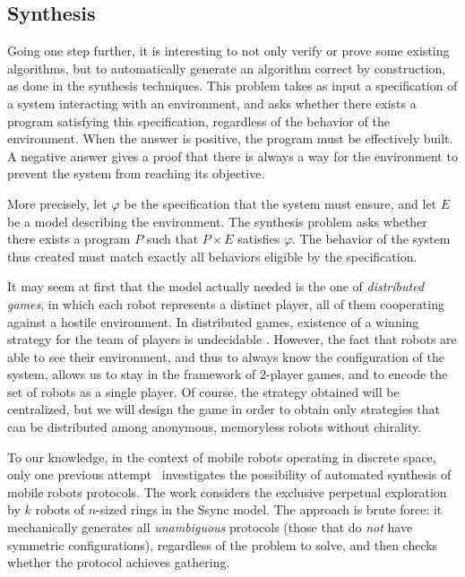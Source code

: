 		\subsection{Synthesis}	 
Going one step further, it is interesting to not only verify or prove some existing algorithms, but to automatically generate an algorithm correct by construction, as done in the synthesis techniques. 
This problem takes as input a specification of a system interacting with an environment, and asks whether there exists a program  satisfying this specification, regardless of the behavior of the environment. When the answer is positive, the program must be effectively built. 
A negative answer gives a proof that there is always a way for the environment to prevent the system from reaching its objective. 

More precisely, let $\varphi$ be the specification that the system must ensure, and let $E$ be a model describing the environment.
The synthesis problem asks whether there exists a program $P$ such that  $P \times E$ satisfies $\varphi$.
The behavior of the system thus created must match exactly all behaviors eligible by the specification. 

It may seem at first that the model actually needed is the one of \emph{distributed games}, in which each robot represents a distinct player, all of them cooperating against a hostile environment. In distributed games, existence of a winning strategy
for the team of players is undecidable \cite{PetersonReif79}. However, the fact that robots are able to see their environment, and thus to always know the configuration of the system, allows us to stay in the framework of 2-player games, and to encode the set of robots as a single player. 
Of course, the strategy obtained will be centralized, but we will design the game in order to obtain only strategies that can be distributed among anonymous, memoryless robots without chirality.

To our knowledge, in the context of mobile robots operating in discrete space, only one previous attempt~\cite{BDPPT12c} investigates the possibility of automated synthesis of mobile robots protocols.
The work considers the exclusive perpetual exploration by $k$ robots of $n$-sized rings in the Ssync model. The approach is brute force: 
it  mechanically generates all \emph{unambiguous} protocols (those that do \emph{not} have symmetric configurations), regardless of the problem to solve, and then checks whether the protocol achieves gathering. 

